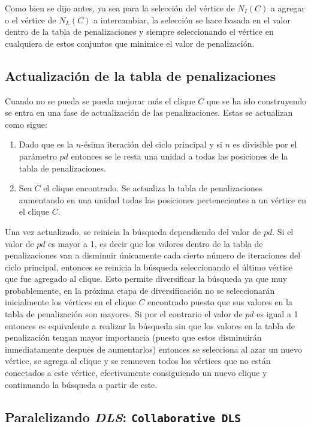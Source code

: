 \documentclass[conference]{IEEEtran}
\begin{document}
Como bien se dijo antes, ya sea para la selección del vértice de
$N_I(C)$ a agregar o el vértice de $N_L(C)$ a intercambiar, la
selección se hace basada en el valor dentro de la tabla de
penalizaciones y siempre seleccionando el vértice en cualquiera de
estos conjuntos que minimice el valor de penalización.

\subsection{Actualización de la tabla de penalizaciones}
\label{sec:dls:update}

Cuando no se pueda se pueda mejorar más el clique $C$ que se ha ido
construyendo se entra en una fase de actualización de las
penalizaciones. Estas se actualizan como sigue:

\begin{enumerate}
\item Dado que es la $n$-ésima iteración del ciclo principal y si $n$
  es divisible por el parámetro $pd$ entonces se le resta una unidad a
  todas las posiciones de la tabla de penalizaciones.
\item Sea $C$ el clique encontrado. Se actualiza la tabla de
  penalizaciones aumentando en una unidad todas las posiciones
  pertenecientes a un vértice en el clique $C$.
\end{enumerate}

Una vez actualizado, se reinicia la búsqueda dependiendo del valor de
$pd$. Si el valor de $pd$ es mayor a 1, es decir que los valores
dentro de la tabla de penalizaciones van a disminuir únicamente cada
cierto número de iteraciones del ciclo principal, entonces se reinicia
la búsqueda seleccionando el último vértice que fue agregado al
clique. Esto permite diversificar la búsqueda ya que muy
probablemente, en la próxima etapa de diversificación no se
seleccionarán inicialmente los vértices en el clique $C$ encontrado
puesto que sus valores en la tabla de penalización son mayores. Si por
el contrario el valor de $pd$ es igual a 1 entonces es equivalente a
realizar la búsqueda sin que los valores en la tabla de penalización
tengan mayor importancia (puesto que estos disminuirán inmediatamente
despues de aumentarlos) entonces se selecciona al azar un nuevo
vértice, se agrega al clique y se remueven todos los vértices que no
están conectados a este vértice, efectivamente consiguiendo un nuevo
clique y continuando la búsqueda a partir de este.

\subsection{Paralelizando \emph{DLS}: \texttt{Collaborative DLS}}
\end{document}
